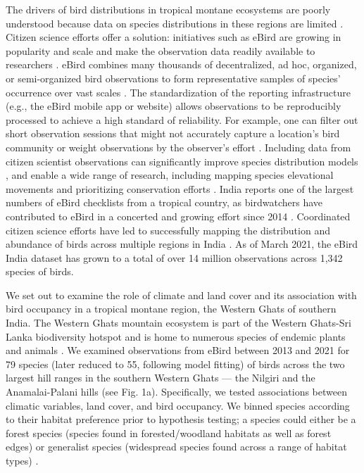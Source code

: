 The drivers of bird distributions in tropical montane ecosystems are poorly understood because data on species distributions in these regions are limited \citep{payne2017a,peters2019}.
Citizen science efforts offer a solution: initiatives such as eBird are growing in popularity and scale and make the observation data readily available to researchers \citep{sullivan2014a}.
eBird combines many thousands of decentralized, ad hoc, organized, or semi-organized bird observations to form representative samples of species' occurrence over vast scales \citep{sullivan2009a,sullivan2014a,wood2011b}.
The standardization of the reporting infrastructure (e.g., the eBird mobile app or website) allows observations to be reproducibly processed to achieve a high standard of reliability.
For example, one can filter out short observation sessions that might not accurately capture a location's bird community or weight observations by the observer's effort \citep{kelling2015c,johnston2018,johnston2021a}.
Including data from citizen scientist observations can significantly improve species distribution models \citep{robinson2020b}, and enable a wide range of research, including mapping species elevational movements \citep{tsai2020a} and prioritizing conservation efforts \citep{vanstrien2013,fink2014a,johnston2015a}.
India reports one of the largest numbers of eBird checklists from a tropical country, as birdwatchers have contributed to eBird in a concerted and growing effort since 2014 \citep{viswanathan2020}.
Coordinated citizen science efforts have led to successfully mapping the distribution and abundance of birds across multiple regions in India \citep[e.g. the Mysore Bird Atlas, and the Kerala Bird Atlas][]{praveenj2021a}.
As of March 2021, the eBird India dataset has grown to a total of over 14 million observations across 1,342 species of birds.

We set out to examine the role of climate and land cover and its association with bird occupancy in a tropical montane region, the Western Ghats of southern India.
The Western Ghats mountain ecosystem is part of the Western Ghats-Sri Lanka biodiversity hotspot and is home to numerous species of endemic plants and animals \citep{myers2000,das2006}.
We examined observations from eBird between 2013 and 2021 for 79 species (later reduced to 55, following model fitting) of birds across the two largest hill ranges in the southern Western Ghats --- the Nilgiri and the Anamalai-Palani hills (see Fig. 1a).
Specifically, we tested associations between climatic variables, land cover, and bird occupancy.
We binned species according to their habitat preference prior to hypothesis testing; a species could either be a forest species (species found in forested/woodland habitats as well as forest edges) or generalist species (widespread species found across a range of habitat types) \citep{ali1983a}.

